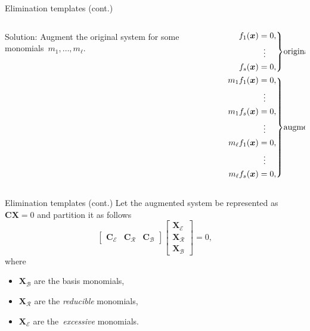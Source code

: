 \documentclass[aspectratio=169]{beamer}
\newcommand{\mat}[1]{\bm{#1}}
\newcommand{\CE}{\ensuremath{\mat{C}_\mathcal{E}}}
\newcommand{\CR}{\ensuremath{\mat{C}_\mathcal{R}}}
\newcommand{\CB}{\ensuremath{\mat{C}_\mathcal{B}}}
\newcommand{\XE}{\ensuremath{\mat{X}_\mathcal{E}}}
\newcommand{\XR}{\ensuremath{\mat{X}_\mathcal{R}}}
\newcommand{\XB}{\ensuremath{\mat{X}_\mathcal{B}}}
\begin{document}
\begin{frame}{Elimination templates (cont.)}
\begin{columns}
    \begin{column}{0.5\textwidth}
\alert{Solution:}
Augment the original system
for some monomials~$m_1,\ldots, m_\ell$.
    \end{column}%
    \begin{column}{0.5\textwidth}
\footnotesize
\begin{equation*}
    \begin{aligned}
    \left.
    \begin{aligned}
    f_1(\mat{x}) & = 0, \\
                 & \hspace{0.575em} \vdots \\
    f_s(\mat{x}) & = 0, \\
    \end{aligned}
    \right\}&\text{original}
    \\
    \left.
    \begin{aligned}
    m_1f_1(\mat{x}) & = 0, \\
                 & \hspace{0.575em} \vdots \\
    m_1f_s(\mat{x}) & = 0, \\
                 & \hspace{0.575em} \vdots \\
    m_\ell f_1(\mat{x}) & = 0, \\
                 & \hspace{0.575em} \vdots \\
    m_\ell f_s(\mat{x}) & = 0,
    \end{aligned}
    \right\}&\text{augmented}
    \end{aligned}
\end{equation*}
    \end{column}
\end{columns}
\end{frame}

\begin{frame}{Elimination templates (cont.)}
Let the augmented system be represented as~$\mat{CX}=0$ and partition it as follows
\begin{equation*}
    \begin{bmatrix}
        \CE &
        \CR &
        \CB
    \end{bmatrix}
    \begin{bmatrix}
        \XE \\
        \XR \\
        \XB
    \end{bmatrix}
    = 0,
\end{equation*}
where
\begin{itemize}
\item $\XB$ are the basis monomials,
\item $\XR$ are the \emph{reducible} monomials,
\item $\XE$ are the~\emph{excessive} monomials.
\end{itemize}
\end{frame}
\end{document}
